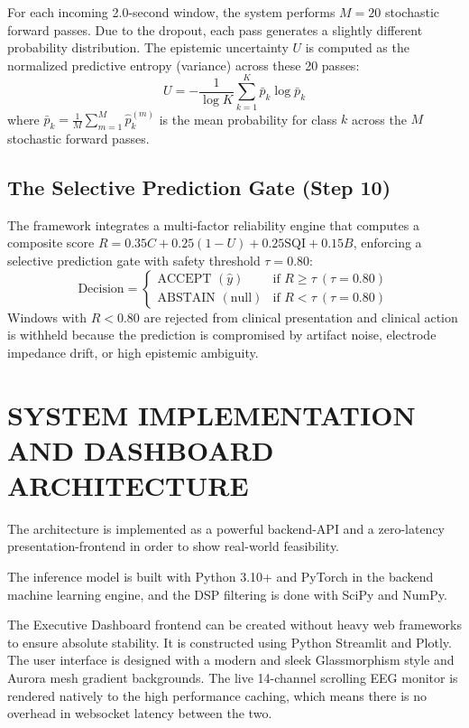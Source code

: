 \documentclass[conference,a4paper]{IEEEtran}
\begin{document}
For each incoming 2.0-second window, the system performs $M = 20$ stochastic forward passes. Due to the dropout, each pass generates a slightly different probability distribution. The epistemic uncertainty $U$ is computed as the normalized predictive entropy (variance) across these 20 passes:
\begin{equation}
U = - \frac{1}{\log K} \sum_{k=1}^K \bar{p}_k \log \bar{p}_k
\end{equation}
where $\bar{p}_k = \frac{1}{M} \sum_{m=1}^M \hat{p}_{k}^{(m)}$ is the mean probability for class $k$ across the $M$ stochastic forward passes.

\subsection{The Selective Prediction Gate (Step 10)}
The framework integrates a multi-factor reliability engine that computes a composite score $R = 0.35 C + 0.25 (1 - U) + 0.25 \text{SQI} + 0.15 B$, enforcing a selective prediction gate with safety threshold $\tau = 0.80$:
\begin{equation}
\text{Decision} = 
\begin{cases} 
\text{ACCEPT } (\hat{y}) & \text{if } R \ge \tau \ (\tau = 0.80) \\
\text{ABSTAIN } (\text{null}) & \text{if } R < \tau \ (\tau = 0.80)
\end{cases}
\end{equation}
Windows with $R < 0.80$ are rejected from clinical presentation and clinical action is withheld because the prediction is compromised by artifact noise, electrode impedance drift, or high epistemic ambiguity.

\section{SYSTEM IMPLEMENTATION AND DASHBOARD ARCHITECTURE}
The architecture is implemented as a powerful backend-API and a zero-latency presentation-frontend in order to show real-world feasibility.  

The inference model is built with Python 3.10+ and PyTorch in the backend machine learning engine, and the DSP filtering is done with SciPy and NumPy.

The Executive Dashboard frontend can be created without heavy web frameworks to ensure absolute stability. It is constructed using Python Streamlit and Plotly. The user interface is designed with a modern and sleek Glassmorphism style and Aurora mesh gradient backgrounds. The live 14-channel scrolling EEG monitor is rendered natively to the high performance caching, which means there is no overhead in websocket latency between the two.
\end{document}
